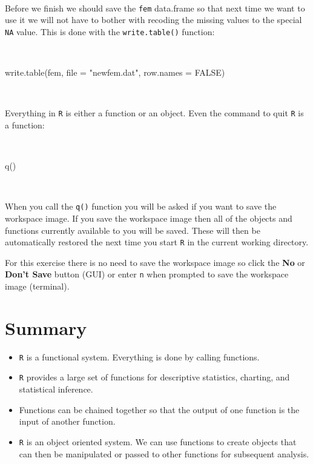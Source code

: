 \documentclass[
  12pt,
]{book}
\newenvironment{Shaded}{\begin{snugshade}}{\end{snugshade}}
\newcommand{\AttributeTok}[1]{\textcolor[rgb]{0.77,0.63,0.00}{#1}}
\newcommand{\ConstantTok}[1]{\textcolor[rgb]{0.00,0.00,0.00}{#1}}
\newcommand{\FunctionTok}[1]{\textcolor[rgb]{0.00,0.00,0.00}{#1}}
\newcommand{\NormalTok}[1]{#1}
\newcommand{\StringTok}[1]{\textcolor[rgb]{0.31,0.60,0.02}{#1}}
\providecommand{\tightlist}{%
  \setlength{\itemsep}{0pt}\setlength{\parskip}{0pt}}
\begin{document}
~

Before we finish we should save the \texttt{fem} data.frame so that next time we want to use it we will not have to bother with recoding the missing values to the special \texttt{NA} value. This is done with the \texttt{write.table()} function:

~

\begin{Shaded}
\begin{Highlighting}[]
\FunctionTok{write.table}\NormalTok{(fem, }\AttributeTok{file =} \StringTok{"newfem.dat"}\NormalTok{, }\AttributeTok{row.names =} \ConstantTok{FALSE}\NormalTok{)}
\end{Highlighting}
\end{Shaded}

~

Everything in \texttt{R} is either a function or an object. Even the command to quit \texttt{R} is a function:

~

\begin{Shaded}
\begin{Highlighting}[]
\FunctionTok{q}\NormalTok{()}
\end{Highlighting}
\end{Shaded}

~

When you call the \texttt{q()} function you will be asked if you want to save the workspace image. If you save the workspace image then all of the objects and functions currently available to you will be saved. These will then be automatically restored the next time you start \texttt{R} in the current working directory.

For this exercise there is no need to save the workspace image so click the \textbf{No} or \textbf{Don't Save} button (GUI) or enter \texttt{n} when prompted to save the workspace image (terminal).

\hypertarget{summary}{%
\section{Summary}\label{summary}}

\begin{itemize}
\tightlist
\item
  \texttt{R} is a functional system. Everything is done by calling functions.
\item
  \texttt{R} provides a large set of functions for descriptive statistics, charting, and statistical inference.
\item
  Functions can be chained together so that the output of one function is the input of another function.
\item
  \texttt{R} is an object oriented system. We can use functions to create objects that can then be manipulated or passed to other functions for subsequent analysis.
\end{itemize}
\end{document}
